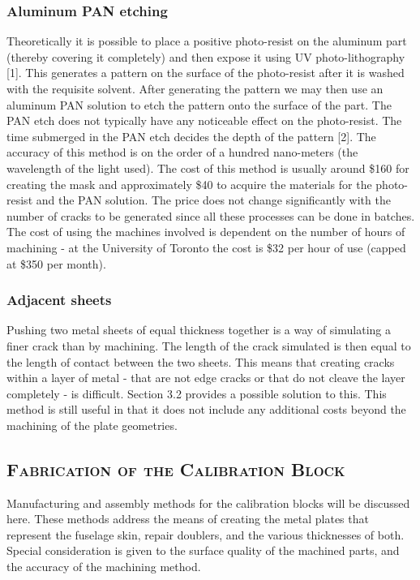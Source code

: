 \documentclass[12pt]{article}
\begin{document}
\subsubsection{Aluminum PAN etching}
Theoretically it is possible to place a positive photo-resist on the aluminum part (thereby covering it completely) and then expose it using UV photo-lithography [1]. This generates a pattern on the surface of the photo-resist after it is washed with the requisite solvent. After generating the pattern we may then use an aluminum PAN solution to etch the pattern onto the surface of the part. The PAN etch does not typically have any noticeable effect on the photo-resist. The time submerged in the PAN etch decides the depth of the pattern [2]. The accuracy of this method is on the order of a hundred nano-meters (the wavelength of the light used). The cost of this method is usually around \$160 for creating the mask and approximately \$40 to acquire the materials for the photo-resist and the PAN solution. The price does not change significantly with the number of cracks to be generated since all these processes can be done in batches. The cost of using the machines involved is dependent on the number of hours of machining - at the University of Toronto the cost is \$32 per hour of use (capped at \$350 per month).

\subsubsection{Adjacent sheets}
Pushing two metal sheets of equal thickness together is a way of simulating a finer crack than by machining. The length of the crack simulated is then equal to the length of contact between the two sheets. This means that creating cracks within a layer of metal - that are not edge cracks or that do not cleave the layer completely - is difficult. Section 3.2 provides a possible solution to this. This method is still useful in that it does not include any additional costs beyond the machining of the plate geometries.


\subsection{\textsc{Fabrication of the Calibration Block}}
Manufacturing and assembly methods for the calibration blocks will be discussed here. These methods address the means of creating the metal plates that represent the fuselage skin, repair doublers, and the various thicknesses of both.  Special consideration is given to the surface quality of the machined parts, and the accuracy of the machining method. 
\end{document}
